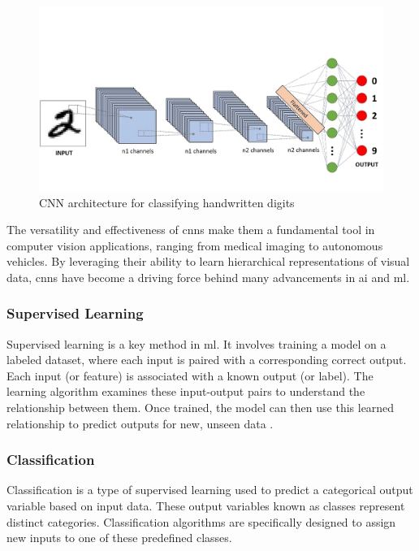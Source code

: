 \begin{figure}[h!]
    \centering
    \includegraphics[width=0.75\linewidth]{figures/theory/machine-learning/convolutional-neural-network.png}
    \caption[Example of CNN architecture for handwritten digit classification]{CNN architecture for classifying handwritten digits \cite{medium:cnn}}
    \label{fig:convolutional-neural-network}
\end{figure}

The versatility and effectiveness of \glspl{cnn} make them a fundamental tool in computer vision applications, ranging from medical imaging to autonomous vehicles. By leveraging their ability to learn hierarchical representations of visual data, \glspl{cnn} have become a driving force behind many advancements in \gls{ai} and \gls{ml}.

\subsubsection*{Supervised Learning} \label{subsubsec:supervised-learning}

Supervised learning is a key method in \gls{ml}. It involves training a model on a labeled dataset, where each input is paired with a corresponding correct output. Each input (or feature) is associated with a known output (or label). The learning algorithm examines these input-output pairs to understand the relationship between them. Once trained, the model can then use this learned relationship to predict outputs for new, unseen data \cite{geeksforgeeks:supervised-learning}
\cite{google:supervised-learning}. \\

\subsubsection*{Classification}
\label{subsubsec:classification}

Classification is a type of supervised learning used to predict a categorical output variable based on input data. These output variables known as classes represent distinct categories. Classification algorithms are specifically designed to assign new inputs to one of these predefined classes. \cite{google:supervised-learning} \\

